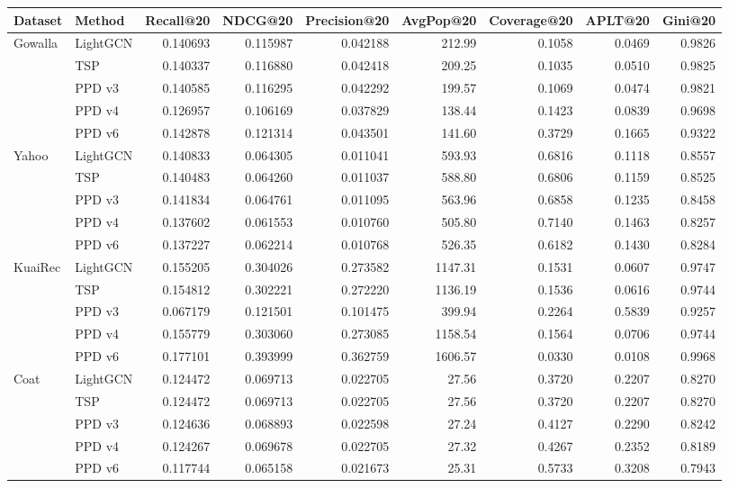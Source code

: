 \begin{tabular}{llrrrrrrr}
\toprule
Dataset & Method & Recall@20 & NDCG@20 & Precision@20 & AvgPop@20 & Coverage@20 & APLT@20 & Gini@20 \\
\midrule
Gowalla & LightGCN & 0.140693 & 0.115987 & 0.042188 & 212.99 & 0.1058 & 0.0469 & 0.9826 \\
 & TSP & 0.140337 & 0.116880 & 0.042418 & 209.25 & 0.1035 & 0.0510 & 0.9825 \\
 & PPD v3 & 0.140585 & 0.116295 & 0.042292 & 199.57 & 0.1069 & 0.0474 & 0.9821 \\
 & PPD v4 & 0.126957 & 0.106169 & 0.037829 & 138.44 & 0.1423 & 0.0839 & 0.9698 \\
 & PPD v6 & 0.142878 & 0.121314 & 0.043501 & 141.60 & 0.3729 & 0.1665 & 0.9322 \\
\midrule
Yahoo & LightGCN & 0.140833 & 0.064305 & 0.011041 & 593.93 & 0.6816 & 0.1118 & 0.8557 \\
 & TSP & 0.140483 & 0.064260 & 0.011037 & 588.80 & 0.6806 & 0.1159 & 0.8525 \\
 & PPD v3 & 0.141834 & 0.064761 & 0.011095 & 563.96 & 0.6858 & 0.1235 & 0.8458 \\
 & PPD v4 & 0.137602 & 0.061553 & 0.010760 & 505.80 & 0.7140 & 0.1463 & 0.8257 \\
 & PPD v6 & 0.137227 & 0.062214 & 0.010768 & 526.35 & 0.6182 & 0.1430 & 0.8284 \\
\midrule
KuaiRec & LightGCN & 0.155205 & 0.304026 & 0.273582 & 1147.31 & 0.1531 & 0.0607 & 0.9747 \\
 & TSP & 0.154812 & 0.302221 & 0.272220 & 1136.19 & 0.1536 & 0.0616 & 0.9744 \\
 & PPD v3 & 0.067179 & 0.121501 & 0.101475 & 399.94 & 0.2264 & 0.5839 & 0.9257 \\
 & PPD v4 & 0.155779 & 0.303060 & 0.273085 & 1158.54 & 0.1564 & 0.0706 & 0.9744 \\
 & PPD v6 & 0.177101 & 0.393999 & 0.362759 & 1606.57 & 0.0330 & 0.0108 & 0.9968 \\
\midrule
Coat & LightGCN & 0.124472 & 0.069713 & 0.022705 & 27.56 & 0.3720 & 0.2207 & 0.8270 \\
 & TSP & 0.124472 & 0.069713 & 0.022705 & 27.56 & 0.3720 & 0.2207 & 0.8270 \\
 & PPD v3 & 0.124636 & 0.068893 & 0.022598 & 27.24 & 0.4127 & 0.2290 & 0.8242 \\
 & PPD v4 & 0.124267 & 0.069678 & 0.022705 & 27.32 & 0.4267 & 0.2352 & 0.8189 \\
 & PPD v6 & 0.117744 & 0.065158 & 0.021673 & 25.31 & 0.5733 & 0.3208 & 0.7943 \\
\bottomrule
\end{tabular}
